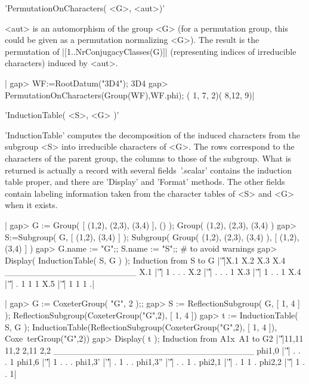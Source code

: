'PermutationOnCharacters( <G>, <aut>)'

<aut>  is an automorphism of  the group <G> (for  a permutation group, this
could  be  given  as  a  permutation  normalizing  <G>).  The result is the
permutation of |[1..NrConjugacyClasses(G)]|   (representing    indices   of
irreducible characters) induced by <aut>.

|    gap> WF:=RootDatum("3D4");
    3D4
    gap> PermutationOnCharacters(Group(WF),WF.phi);
    ( 1, 7, 2)( 8,12, 9)|

%

'InductionTable( <S>, <G> )'

'InductionTable'  computes the decomposition of the induced characters from
the subgroup <S> into irreducible characters of <G>. The rows correspond to
the  characters of the parent group, the  columns to those of the subgroup.
What  is returned  is actually  a record  with several  fields\:\ '.scalar'
contains  the induction table proper, and  there are 'Display' and 'Format'
methods.  The  other  fields  contain  labeling  information taken from the
character tables of <S> and <G> when it exists.

|    gap> G := Group( [ (1,2), (2,3), (3,4) ], () );
    Group( (1,2), (2,3), (3,4) )
    gap> S:=Subgroup( G, [ (1,2), (3,4) ] );
    Subgroup( Group( (1,2), (2,3), (3,4) ), [ (1,2), (3,4) ] )
    gap> G.name := "G";; S.name := "S";; # to avoid warnings
    gap> Display( InductionTable( S, G ) );
    Induction from S to G
        |'\|'|X.1 X.2 X.3 X.4
    _____________________
    X.1 |'\|'|  1   .   .   .
    X.2 |'\|'|  .   .   .   1
    X.3 |'\|'|  1   .   .   1
    X.4 |'\|'|  .   1   1   1
    X.5 |'\|'|  1   1   1   .|

|    gap> G := CoxeterGroup( "G", 2 );;
    gap> S := ReflectionSubgroup( G, [ 1, 4 ] );
    ReflectionSubgroup(CoxeterGroup("G",2), [ 1, 4 ])
    gap> t := InductionTable( S, G );
    InductionTable(ReflectionSubgroup(CoxeterGroup("G",2), [ 1, 4 ]), Coxe\
    terGroup("G",2))
    gap> Display( t );
    Induction from A1x~A1 to G2
               |'\|'|11,11 11,2 2,11 2,2
    ________________________________
    phi{1,0}   |'\|'|    .    .    .   1
    phi{1,6}   |'\|'|    1    .    .   .
    phi{1,3}'  |'\|'|    .    1    .   .
    phi{1,3}'' |'\|'|    .    .    1   .
    phi{2,1}   |'\|'|    .    1    1   .
    phi{2,2}   |'\|'|    1    .    .   1|

